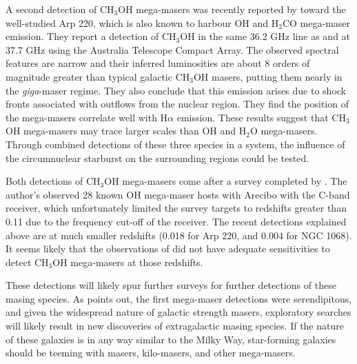 A second detection of CH$_3$OH mega-masers was recently reported by \citet{chen_methanol_2015} toward the well-studied Arp 220, which is also known to harbour OH and H$_2$CO mega-maser emission. They report a detection of CH$_3$OH in the same 36.2 GHz line as \citet{wang2014_SiO_CH3OH} and at 37.7 GHz using the Australia Telescope Compact Array. The observed spectral features are narrow and their inferred luminosities are about 8 orders of magnitude greater than typical galactic CH$_3$OH masers, putting them nearly in the {\it giga}-maser regime. They also conclude that this emission arises due to shock fronts associated with outflows from the nuclear region. They find the position of the mega-masers correlate well with H$\alpha$ emission. These results suggest that CH$_3$OH mega-masers may trace larger scales than OH and H$_2$O mega-masers. Through combined detections of these three species in a system, the influence of the circumnuclear starburst on the surrounding regions could be tested.

Both detections of CH$_3$OH mega-masers come after a survey completed by \citet{darling2003_CH3OH}. The author's observed 28 known OH mega-maser hosts with Arecibo with the C-band receiver, which unfortunately limited the survey targets to redshifts greater than 0.11 due to the frequency cut-off of the receiver. The recent detections explained above are at much smaller redshifts (0.018 for Arp 220, and 0.004 for NGC 1068). It seems likely that the observations of \citet{darling2003_CH3OH} did not have adequate sensitivities to detect CH$_3$OH mega-masers at those redshifts.

These detections will likely spur further surveys for further detections of these masing species. As \citet{darling2012} points out, the first mega-maser detections were serendipitous, and given the widespread nature of galactic strength masers, exploratory searches will likely result in new discoveries of extragalactic masing species. If the nature of these galaxies is in any way similar to the Milky Way, star-forming galaxies should be teeming with masers, kilo-masers, and other mega-masers. 